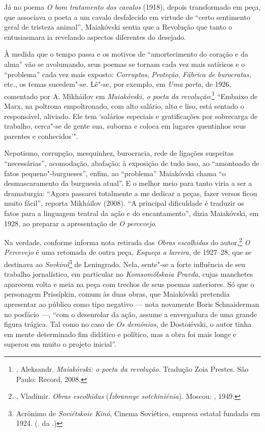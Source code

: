 Já no poema \emph{O bom tratamento dos cavalos} (1918), depois
transformado em peça, que associava o poeta a um cavalo desfalecido em
virtude de ``certo sentimento geral de tristeza animal'', Maiakóvski
sentia que a Revolução que tanto o entusiasmara ia revelando aspectos
diferentes do desejado.

À medida que o tempo passa e os motivos de ``amortecimento do coração e
da alma'' vão se avolumando, seus poemas se tornam cada vez mais
satíricos e o ``problema'' cada vez mais exposto: \emph{Corruptos},
\emph{Proteção}, \emph{Fábrica de burocratas}, etc., os temas
sucedem"-se. Lê"-se, por exemplo, em \emph{Uma porta}, de 1926, comentado
por A. Mikháilov em \emph{Maiakóvski, o poeta da revolução}:\footnote{,
  Aleksandr. \emph{Maiakóvski: o poeta da revolução}. Tradução Zoia
  Prestes. São Paulo: Record, 2008.} ``Embaixo de Marx, na poltrona
empoltronado, com alto salário, alto e liso, está sentado o responsável,
aliviado. Ele tem `salários especiais e gratificações por sobrecarga de
trabalho, cerca"-se de gente sua, suborna e coloca em lugares quentinhos
seus parentes e conhecidos'".

Nepotismo, corrupção, mesquinhez, burocracia, rede de ligações suspeitas
``necessárias'', acomodação, abafação: à exposição de tudo isso, ao
``amontoado de fatos pequeno"-burgueses'', enfim, ao ``problema'' Maiakóvski
chama ``o desmascaramento da burguesia atual''. E o melhor meio para
tanto viria a ser a dramaturgia: ``Agora passarei totalmente a me dedicar
a peças, fazer versos ficou muito fácil'', reporta Mikháilov (2008). ``A
principal dificuldade é traduzir os fatos para a linguagem teatral da
ação e do encantamento'', dizia Maiakóvski, em 1928, ao preparar a
apresentação de \emph{O percevejo}.

Na verdade, conforme informa nota retirada das \emph{Obras escolhidas}
do autor,\footnote{, Vladímir. \emph{Obras escolhidas}
  (\emph{Ízbrannye sotchiniénia}). Moscou: , 1949.} \emph{O
Percevejo} é uma retomada de outra peça, \emph{Esqueça a lareira}, de
1927--28, que se destinava ao \emph{Sovkinó}\footnote{Acrônimo de
  \emph{Soviétskoie Kinó}, Cinema Soviético, empresa estatal fundada em
  1924. (. da .)} de Leningrado. Nela, sente"-se a forte influência de
seu trabalho jornalístico, em particular no \emph{Komsomólskaia Pravda},
cujas manchetes aparecem volta e meia na peça com trechos de seus poemas
anteriores. Só que o personagem Prissípkin, comum às duas obras, que
Maiakóvski pretendia apresentar ao público como tipo negativo --- nota
novamente Boris Schnaiderman no posfácio ---, ``com o desenrolar da ação,
assume a envergadura de uma grande figura trágica. Tal como no caso de
\emph{Os demônios}, de Dostoiévski, o autor tinha em mente determinado
fim didático e político, mas a obra foi mais longe e superou em muito o
projeto inicial''.

